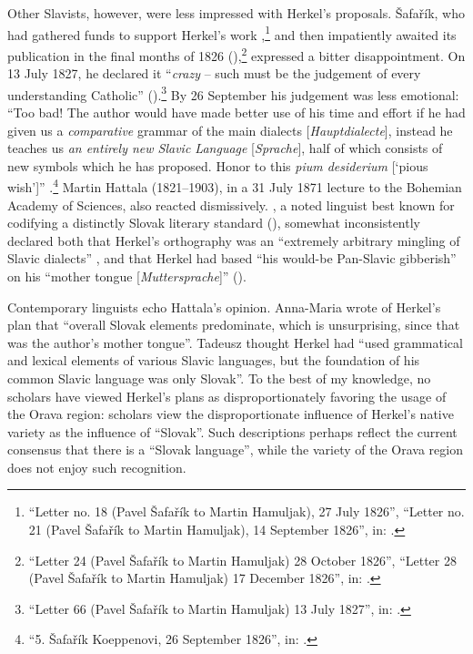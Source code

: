 Other Slavists, however, were less impressed with Herkel’s proposals. Šafařík, who had gathered funds to support Herkel’s work \citep[68, 75]{matovcik_listy_1965},\footnote{“Letter no. 18 (Pavel Šafařík to Martin Hamuljak), 27 July 1826”, “Letter no. 21 (Pavel Šafařík to Martin Hamuljak), 14 September 1826”, in: \citet[68, 75]{matovcik_listy_1965}.} and then impatiently awaited its publication in the final months of 1826 (\citeyear[85, 95]{matovcik_listy_1965}),\footnote{“Letter 24 (Pavel Šafařík to Martin Hamuljak) 28 October 1826”, “Letter 28 (Pavel Šafařík to Martin Hamuljak) 17 December 1826”, in: \citet[85, 95]{matovcik_listy_1965}.} expressed a bitter disappointment. On 13 July 1827, he declared it “\textit{crazy} – such must be the judgement of every understanding Catholic” (\citeyear[164]{matovcik_listy_1965}).\footnote{“Letter 66 (Pavel Šafařík to Martin Hamuljak) 13 July 1827”, in: \citet[164]{matovcik_listy_1965}.} By 26 September his judgement was less emotional: “Too bad! The author would have made better use of his time and effort if he had given us a \textit{comparative} grammar of the main dialects [\textit{Hauptdialecte}], instead he teaches us \textit{an entirely new Slavic Language} [\textit{Sprache}], half of which consists of new symbols which he has proposed. Honor to this \textit{pium desiderium} [‘pious wish’]” \citep[310]{francev_korespondence_1927}.\footnote{“5. Šafařík Koeppenovi, 26 September 1826”, in: \citet[310]{francev_korespondence_1927}.} Martin Hattala (1821--1903), in a 31 July 1871 lecture to the Bohemian Academy of Sciences, also reacted dismissively. \citeauthor{hattala_grammatica_1850}, a noted linguist best known for codifying a distinctly Slovak literary standard (\citeyear{hattala_grammatica_1850, hattala_mluvnica_1865}), somewhat inconsistently declared both that Herkel’s orthography was an “extremely arbitrary mingling of Slavic dialects” \citep[51]{anon_sitzung_1872}, and that Herkel had based “his would-be Pan-Slavic gibberish” on his “mother tongue [\textit{Muttersprache}]” (\citeyear[52]{anon_sitzung_1872}).

Contemporary linguists echo Hattala’s opinion. Anna-Maria \citet[104]{meyer_wiederbelebung_2014} wrote of Herkel’s plan that “overall Slovak elements predominate, which is unsurprising, since that was the author’s mother tongue”. Tadeusz \citet[80]{lewaszkiewicz_miedzy_2014} thought Herkel had “used grammatical and lexical elements of various Slavic languages, but the foundation of his common Slavic language was only Slovak”. To the best of my knowledge, no scholars have viewed Herkel’s plans as disproportionately favoring the usage of the Orava region: scholars view the disproportionate influence of Herkel’s native variety as the influence of “Slovak”. Such descriptions perhaps reflect the current consensus that there is a “Slovak language”, while the variety of the Orava region does not enjoy such recognition.

